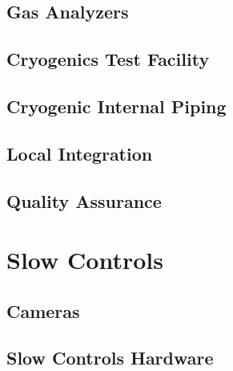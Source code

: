\subsection{Gas Analyzers}
\label{sec:fddp-slow-cryo-gas-anlyz}

\subsection{Cryogenics Test Facility}
\label{sec:fddp-slow-cryo-test-facil}

\subsection{Cryogenic Internal Piping}
\label{sec:fddp-slow-cryo-int-piping}

\subsection{Local Integration}
\label{sec:fddp-slow-cryo-loc-integ}


\subsection{Quality Assurance}
\label{sec:fddp-slow-cryo-qa}



\section{Slow Controls}
\label{sec:fddp-slow-cryo-ctrl}




\subsection{Cameras}
\label{sec:fddp-slow-cryo-cameras}

\subsection{Slow Controls Hardware}
\label{sec:fddp-slow-cryo-hdwr}

